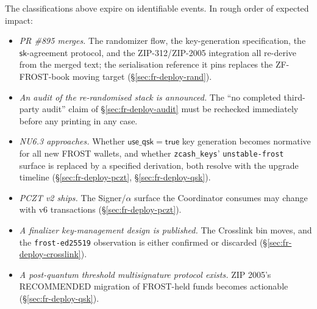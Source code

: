 \documentclass[11pt,a4paper]{article}
\theoremstyle{definition}
\begin{document}
The classifications above expire on identifiable events. In rough order
of expected impact:

\begin{itemize}
\item \emph{PR \#895 merges.} The randomizer flow, the key-generation
  specification, the $\mathsf{sk}$-agreement protocol, and the
  ZIP-312/ZIP-2005 integration all re-derive from the merged text; the
  serialisation reference it pins replaces the ZF-FROST-book moving
  target (\S\ref{sec:fr-deploy-rand}).
\item \emph{An audit of the re-randomised stack is announced.} The
  ``no completed third-party audit'' claim of
  \S\ref{sec:fr-deploy-audit} must be rechecked immediately before any
  printing in any case.
\item \emph{NU6.3 approaches.} Whether $\mathsf{use\_qsk} =
  \mathsf{true}$ key generation becomes normative for all new FROST
  wallets, and whether \texttt{zcash\_keys}' \texttt{unstable-frost}
  surface is replaced by a specified derivation, both resolve with the
  upgrade timeline (\S\ref{sec:fr-deploy-pczt},
  \S\ref{sec:fr-deploy-qsk}).
\item \emph{PCZT v2 ships.} The Signer/$\alpha$ surface the Coordinator
  consumes may change with v6 transactions
  (\S\ref{sec:fr-deploy-pczt}).
\item \emph{A finalizer key-management design is published.} The
  Crosslink bin moves, and the \texttt{frost-ed25519} observation is
  either confirmed or discarded (\S\ref{sec:fr-deploy-crosslink}).
\item \emph{A post-quantum threshold multisignature protocol exists.}
  ZIP 2005's RECOMMENDED migration of FROST-held funds becomes
  actionable (\S\ref{sec:fr-deploy-qsk}).
\end{itemize}
\end{document}
